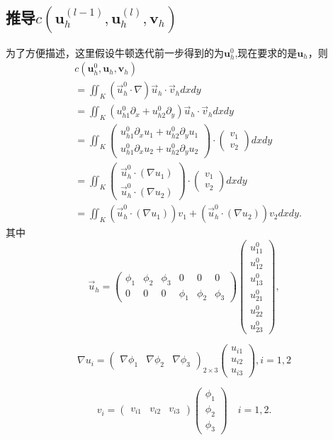 \documentclass{ctexart}
\begin{document}
\subsection{推导$c(\mathbf{u}_h^{(l-1)}, \mathbf{u}_h^{(l)}, \mathbf{v}_h)$}
为了方便描述，这里假设牛顿迭代前一步得到的为$\mathbf{u}_h^0$,现在要求的是$\mathbf{u}_h$，则
\begin{align*}
    & c(\mathbf{u}_h^{0}, \mathbf{u}_h, \mathbf{v}_h)\\ 
    & = \iint_K(\vec{u} _h^0 \cdot \nabla) \vec{u}_h\cdot \vec{v}_hdxdy\\ 
    & = \iint_K(u_{h1}^0 \partial_x + u_{h2}^0 \partial_y) \vec{u}_h \cdot \vec{v}_h dxdy\\
    & = \iint_K \begin{pmatrix}
     u_{h1}^0\partial _xu_1 + u_{h2}^0\partial _yu_1 \\
     u_{h1}^0\partial _xu_2 + u_{h2}^0\partial _yu_2
    \end{pmatrix}
    \cdot \begin{pmatrix}
     v_1\\
    v_2
    \end{pmatrix}dxdy\\
    & = \iint_K \begin{pmatrix}
     \vec{u}_h^0 \cdot (\nabla u_1) \\
     \vec{u}_h^0 \cdot (\nabla u_2)
    \end{pmatrix}
    \cdot \begin{pmatrix}
     v_1\\
    v_2
    \end{pmatrix}dxdy\\
    & = \iint_K (\vec{u}_h^0 \cdot (\nabla u_1)) v_1 + (\vec{u}_h^0 \cdot (\nabla u_2)) v_2dxdy.
\end{align*}
其中
$$
\vec{u}_h = \begin{pmatrix}
    \phi_1&  \phi_2& \phi_3 & 0 & 0 & 0\\
    0 & 0 & 0 & \phi_1 & \phi_2 & \phi_3
  \end{pmatrix} 
  \begin{pmatrix}
   u_{11}^0\\
   u_{12}^0\\
   u_{13}^0\\
   u_{21}^0\\
   u_{22}^0\\
   u_{23}^0
  \end{pmatrix},
$$

$$
\nabla u_i = \begin{pmatrix}
    \nabla \phi_1& \nabla \phi_2 & \nabla \phi_3
  \end{pmatrix}_{2 \times 3}
  \begin{pmatrix}
   u_{i1}\\
   u_{i2}\\
  u_{i3}
  \end{pmatrix},i=1,2
$$

$$
v_i = 
\begin{pmatrix}
  v_{i1}& v_{i2}  & v_{i3}
\end{pmatrix}
\begin{pmatrix}
 \phi _1\\
  \phi _2\\
 \phi _3
\end{pmatrix}
\quad i=1,2.
$$
\end{document}
